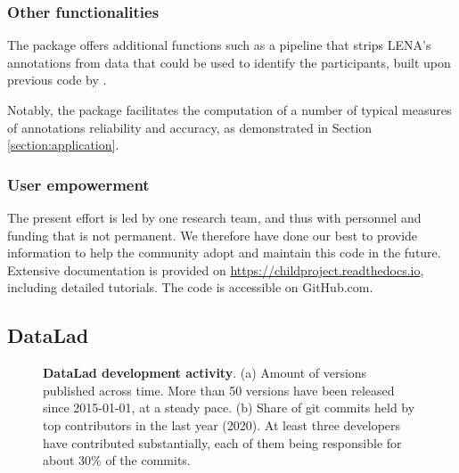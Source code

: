 \documentclass[smallextended]{svjour3}       %
\begin{document}
\subsubsection*{Other functionalities}

The package offers additional functions such as a pipeline that strips LENA's annotations from data that could be used to identify the participants, built upon previous code by \citet{eaf-anonymizer-original}.

Notably, the package facilitates the computation of a number of typical measures of annotations reliability and accuracy, as demonstrated in Section \ref{section:application}.

\subsubsection*{User empowerment}

The present effort is led by one research team, and thus with personnel and funding that is not permanent. We therefore have done our best to provide information to help the community adopt and maintain this code in the future. Extensive documentation is provided on \url{https://childproject.readthedocs.io}, including detailed tutorials. The code is accessible on GitHub.com.


\subsection{DataLad}\label{section:datalad}

\begin{figure}[htb]
\centering
\begin{minipage}{.5\linewidth}
\centering
\subfloat[]{\label{datalad:a}\resizebox{!}{0.70\linewidth}{\large\normalsize}}
\end{minipage}%
\begin{minipage}{.5\linewidth}
\centering
\subfloat[]{\label{datalad:b}\resizebox{!}{0.70\linewidth}{\large\normalsize}}
\end{minipage}\par\medskip


\caption{\label{fig:datalad}\textbf{DataLad development activity}. (a) Amount of versions published across time. More than 50 versions have been released since 2015-01-01, at a steady pace. (b) Share of git commits held by top contributors in the last year (2020). At least three developers have contributed substantially, each of them being responsible for about 30\% of the commits.}

\end{figure}
\end{document}
